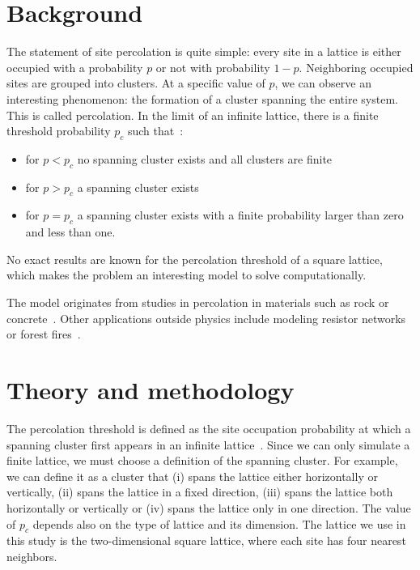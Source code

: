 

\section{Background}

The statement of site percolation is quite simple: every site in a lattice is either occupied with a probability $p$ or not with probability $1-p$. Neighboring occupied sites are grouped into clusters. At a specific value of $p$, we can observe an interesting phenomenon: the formation of a cluster spanning the entire system. This is called percolation. In the limit of an infinite lattice, there is a finite threshold probability $p_c$ such that~\cite{Gould_2006}:
\begin{itemize}
	\item for $p < p_c$ no spanning cluster exists and all clusters are finite
	\item for $p > p_c$ a spanning cluster exists
	\item for $p = p_c$ a spanning cluster exists with a finite probability larger than zero and less than one.
\end{itemize}
No exact results are known for the percolation threshold of a square lattice, which makes the problem an interesting model to solve computationally.

The model originates from studies in percolation in materials such as rock or concrete~\cite{Newman_2001}. Other applications outside physics include modeling resistor networks or forest fires~\cite{Newman_2001}. 


\section{Theory and methodology}
The percolation threshold is defined as the site occupation probability at which a spanning cluster first appears in an infinite lattice~\cite{Gould_2006}. Since we can only simulate a finite lattice, we must choose a definition of the spanning cluster. For example, we can define it as a cluster that (i) spans the lattice either horizontally or vertically, (ii) spans the lattice in a fixed direction, (iii) spans the lattice both horizontally or vertically or (iv) spans the lattice only in one direction. The value of $p_c$ depends also on the type of lattice and its dimension. The lattice we use in this study is the two-dimensional square lattice, where each site has four nearest neighbors.

